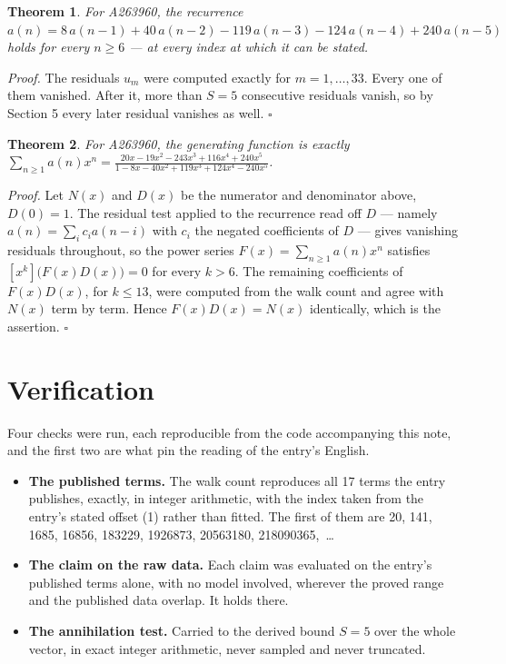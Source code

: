 \documentclass[11pt]{article}
\newtheorem{theorem}{Theorem}
\theoremstyle{definition}
\begin{document}
\begin{theorem} For A263960, the recurrence $a(n) = 8\,a(n-1) + 40\,a(n-2) - 119\,a(n-3) - 124\,a(n-4) + 240\,a(n-5)$ holds for every $n \ge 6$ --- at every index at which it can be stated.\end{theorem}

{\itshape Proof.} The residuals $u_m$ were computed exactly for $m = 1,\dots,33$. Every one of them vanished. After it, more than $S = 5$ consecutive residuals vanish, so by Section 5 every later residual vanishes as well. $\square$

\begin{theorem} For A263960, the generating function is exactly $\sum_{n\ge 1} a(n)x^n = \frac{20x - 19x^{2} - 243x^{3} + 116x^{4} + 240x^{5}}{1 - 8x - 40x^{2} + 119x^{3} + 124x^{4} - 240x^{5}}$.\end{theorem}

{\itshape Proof.} Let $N(x)$ and $D(x)$ be the numerator and denominator above, $D(0)=1$. The residual test applied to the recurrence read off $D$ --- namely $a(n) = \sum_i c_i a(n-i)$ with $c_i$ the negated coefficients of $D$ --- gives vanishing residuals throughout, so the power series $F(x)=\sum_{n\ge 1}a(n)x^n$ satisfies $[x^k]\bigl(F(x)D(x)\bigr) = 0$ for every $k > 6$. The remaining coefficients of $F(x)D(x)$, for $k \le 13$, were computed from the walk count and agree with $N(x)$ term by term. Hence $F(x)D(x) = N(x)$ identically, which is the assertion. $\square$

\section{Verification}

Four checks were run, each reproducible from the code accompanying this note, and the first two are what pin the reading of the entry's English.

\begin{itemize}

\item {\bfseries The published terms.} The walk count reproduces all 17 terms the entry publishes, exactly, in integer arithmetic, with the index taken from the entry's stated offset (1) rather than fitted. The first of them are 20, 141, 1685, 16856, 183229, 1926873, 20563180, 218090365,~\dots

\item {\bfseries The claim on the raw data.} Each claim was evaluated on the entry's published terms alone, with no model involved, wherever the proved range and the published data overlap. It holds there.

\item {\bfseries The annihilation test.} Carried to the derived bound $S = 5$ over the whole vector, in exact integer arithmetic, never sampled and never truncated.

\end{itemize}
\end{document}
